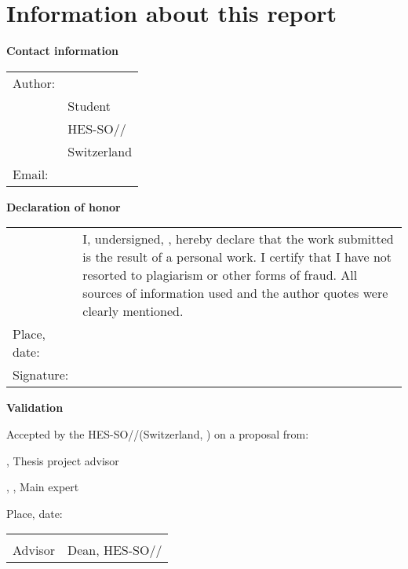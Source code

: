 \chapter*{Information about this report}

\vspace{\fill}

\textbf{Contact information}

\begin{tabularx}{\textwidth}{L{2.5cm}X}
	Author:	 & \AuthorFirstName \AuthorLastName \\
	& \Diploma Student \\
	& HES-SO//\Diploma \\
	& Switzerland \\
	Email: & \email{\AuthorEmail}
\end{tabularx}

\vspace{\fill}

\textbf{Declaration of honor}

{\renewcommand{\arraystretch}{2}
\begin{tabularx}{\textwidth}{L{2.5cm}X}
	& I, undersigned, \Author, hereby declare that the work submitted is 
	the result of a personal work. I certify that I have not resorted to 
	plagiarism or other forms of fraud. All sources of information used and the 
	author quotes were clearly mentioned. \\
	Place, date: & \underline{\hspace{7cm}} \\ 
	Signature: & \underline{\hspace{7cm}}
\end{tabularx}
}

\vspace{\fill}

\textbf{Validation}

Accepted by the HES-SO//\Diploma (Switzerland, \Place) on a proposal from:

\vspace{0.5cm}

\Advisor, Thesis project advisor

\Expert, \ExpertLab, Main expert

\vspace{1cm}

Place, date: \underline{\hspace{8cm}}

\vspace{3cm}

{ \renewcommand{\arraystretch}{1.5}
\begin{tabularx}{\textwidth}{X X}
	\Advisor  & \Dean\\ 
	Advisor   & Dean, HES-SO//\Diploma\\
\end{tabularx}
}